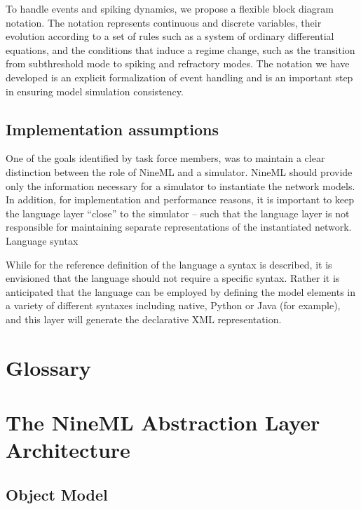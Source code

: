 \documentclass[a4paper]{article}
\begin{document}
To handle events and spiking dynamics, we propose a flexible block diagram notation. The notation represents continuous and discrete variables, their evolution according to a set of rules such as a system of ordinary differential equations, and the conditions that induce a regime change, such as the transition from subthreshold mode to spiking and refractory modes. The notation we have developed is an explicit formalization of event handling and is an important step in ensuring model simulation consistency.

 
\subsection{Implementation assumptions}

One of the goals identified by task force members, was to maintain a
clear distinction between the role of NineML and a simulator. NineML
should provide only the information necessary for a simulator to
instantiate the network models. In addition, for implementation and
performance reasons, it is important to keep the language layer
“close” to the simulator – such that the language layer is not
responsible for maintaining separate representations of the
instantiated network.  Language syntax

While for the reference definition of the language a syntax is
described, it is envisioned that the language should not require a
specific syntax. Rather it is anticipated that the language can be
employed by defining the model elements in a variety of different
syntaxes including native, Python or Java (for example), and this
layer will generate the declarative XML representation.

\section{Glossary} 

\section{The NineML Abstraction Layer Architecture}

\subsection{Object Model}
\end{document}
